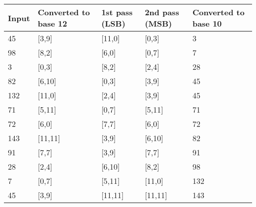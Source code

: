 \documentclass[11pt]{article}
\begin{document}
\pagebreak

\begin{center}
\begin{tabular}{|p{7em}|p{7em}|p{7em}|p{7em}|p{7em}|} 
\hline
\textbf{Input} & \textbf{Converted to base 12} & \textbf{1st pass (LSB)} & \textbf{2nd pass (MSB)} & \textbf{Converted to base 10} \\ 
\hline
45 & [3,9]  & [11,0]  & [0,3]    & 3   \\
\hline
98 & [8,2]  & [6,0]   & [0,7]    & 7   \\
\hline
3  & [0,3]  & [8,2]   & [2,4]    & 28  \\
\hline
82 & [6,10] & [0,3]   & [3,9]    & 45  \\
\hline
132& [11,0] & [2,4]   & [3,9]    & 45  \\
\hline
71 & [5,11] & [0,7]   & [5,11]   & 71  \\
\hline
72 & [6,0]  & [7,7]   & [6,0]    & 72  \\
\hline
143& [11,11]& [3,9]   & [6,10]   & 82  \\
\hline
91 & [7,7]  & [3,9]   & [7,7]    & 91  \\
\hline
28 & [2,4]  & [6,10]  & [8,2]    & 98  \\
\hline
7  & [0,7]  & [5,11]  & [11,0]   & 132 \\
\hline
45 & [3,9]  & [11,11] & [11,11]  & 143 \\
\hline
\end{tabular}
\end{center}
\end{document}

